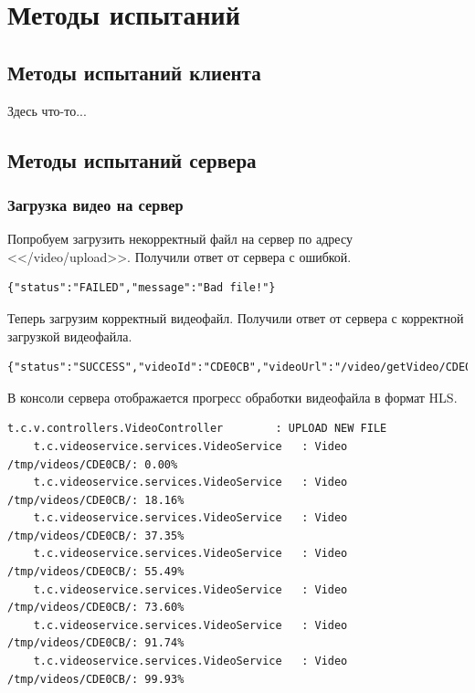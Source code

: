 \documentclass{../includes/TechDocMultiAuthors}
\begin{document}
    \section{Методы испытаний}

    \subsection{Методы испытаний клиента}

    Здесь что-то...

    \subsection{Методы испытаний сервера}

    \subsubsection{Загрузка видео на сервер}

    Попробуем загрузить некорректный файл на сервер по адресу <</video/upload>>.
    Получили ответ от сервера с ошибкой.

    \begin{lstlisting}[language=text,caption={Ответ сервера при загрузке некорректного файла}]
    {"status":"FAILED","message":"Bad file!"}
    \end{lstlisting}

    Теперь загрузим корректный видеофайл.
    Получили ответ от сервера с корректной загрузкой видеофайла.

    \begin{lstlisting}[language=text,caption={Ответ сервера при загрузке корректного файла}]
    {"status":"SUCCESS","videoId":"CDE0CB","videoUrl":"/video/getVideo/CDE0CB/video.m3u8"}
    \end{lstlisting}

    В консоли сервера отображается прогресс обработки видеофайла в формат HLS.

    \begin{lstlisting}[language=text,caption={Информация об обработке файла в консоли}]
    t.c.v.controllers.VideoController        : UPLOAD NEW FILE
    t.c.videoservice.services.VideoService   : Video /tmp/videos/CDE0CB/: 0.00%
    t.c.videoservice.services.VideoService   : Video /tmp/videos/CDE0CB/: 18.16%
    t.c.videoservice.services.VideoService   : Video /tmp/videos/CDE0CB/: 37.35%
    t.c.videoservice.services.VideoService   : Video /tmp/videos/CDE0CB/: 55.49%
    t.c.videoservice.services.VideoService   : Video /tmp/videos/CDE0CB/: 73.60%
    t.c.videoservice.services.VideoService   : Video /tmp/videos/CDE0CB/: 91.74%
    t.c.videoservice.services.VideoService   : Video /tmp/videos/CDE0CB/: 99.93%
    \end{lstlisting}
\end{document}
